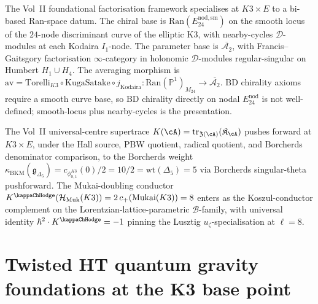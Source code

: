 \begin{remark}
\label{rem:vol2-found-bi-based}
The Vol~II foundational factorisation framework specialises at
$K3 \times E$ to a bi-based Ran-space datum. The chiral base is
$\mathrm{Ran}(E^{\mathrm{nod,sm}}_{24})$ on the smooth locus of the
$24$-node discriminant curve of the elliptic K3, with nearby-cycles
$\mathcal{D}$-modules at each Kodaira $I_1$-node. The parameter base is
$\overline{\mathcal{A}_2}$, with Francis--Gaitsgory factorisation
$\infty$-category in holonomic $\mathcal{D}$-modules regular-singular
on Humbert $H_1 \cup H_4$. The averaging morphism is
$\mathrm{av} = \mathrm{Torelli}_{K3} \circ \mathrm{KugaSatake} \circ
j_{\mathrm{Kodaira}} \colon \mathrm{Ran}(\mathbb{P}^1)_{M_{24}} \to
\overline{\mathcal{A}_2}$. BD chirality axioms require a smooth curve
base, so BD chirality directly on nodal $E^{\mathrm{nod}}_{24}$ is not
well-defined; smooth-locus plus nearby-cycles is the presentation.
\end{remark}

\begin{remark}
\label{rem:vol2-found-trinity-K3}
The Vol~II universal-centre supertrace
$K(\cA) = \mathrm{tr}_{\mathfrak{Z}(\cA)}(\mathfrak{K}_\cA)$ pushes
forward at $K3 \times E$, under the Hall source, PBW quotient,
radical quotient, and Borcherds denominator comparison, to the
Borcherds weight
$\kappa_{\mathrm{BKM}}(\mathfrak{g}_{\Delta_5})
= c_{\phi_{0,1}^{K3}}(0)/2 = 10/2 = \mathrm{wt}(\Delta_5) = 5$ via
Borcherds singular-theta pushforward. The Mukai-doubling conductor
$K^{\kappaChHodge}(\mathcal{H}_{\mathrm{Muk}}(K3))
= 2\,c_+(\mathrm{Mukai}(K3)) = 8$ enters as the Koszul-conductor
complement on the Lorentzian-lattice-parametric $\mathcal{B}$-family,
with universal identity $\hbar^2 \cdot K^{\kappaChHodge} = -1$
pinning the Lusztig $u_\zeta$-specialisation at $\ell = 8$.
\end{remark}

\section{Twisted HT quantum gravity foundations at the K3 base point}
\label{sec:vol2fnd-deep}

